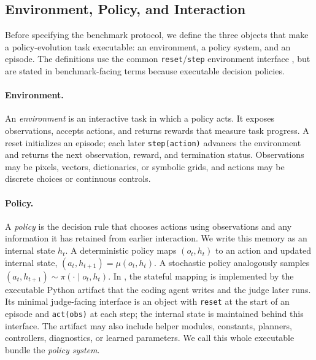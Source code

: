 \subsection{Environment, Policy, and Interaction}
\label{sec:task-objects}

Before specifying the benchmark protocol, we define the three objects that make
a policy-evolution task executable: an environment, a policy system, and an
episode. The definitions use the common \texttt{reset}/\texttt{step}
environment interface \citep{gymnasium}, but are stated in benchmark-facing
terms because 
executable decision policies.

\paragraph{Environment.}
An \emph{environment} is an interactive task in which a policy acts. It exposes
observations, accepts actions, and returns rewards that measure task progress.
A reset initializes an episode; each later \texttt{step(action)} advances the
environment and returns the next observation, reward, and termination status.
Observations may be pixels, vectors, dictionaries, or symbolic grids, and
actions may be discrete choices or continuous controls.

\paragraph{Policy.}
A \emph{policy} is the decision rule that chooses actions using observations
and any information it has retained from earlier interaction. We write this
memory as an internal state $h_t$. A deterministic policy maps
$(o_t,h_t)$ to an action and updated internal state,
$(a_t,h_{t+1})=\mu(o_t,h_t)$. A stochastic policy analogously samples
$(a_t,h_{t+1}) \sim \pi(\cdot \mid o_t,h_t)$. In \evopolicygym{}, the
stateful mapping is implemented by the executable Python artifact that the coding agent writes and the judge later runs. Its minimal judge-facing interface is an object with \texttt{reset} at the start of an episode and \texttt{act(obs)} at each step; the internal state is maintained behind this interface. The artifact may also include helper modules, constants, planners, controllers, diagnostics, or learned parameters. We call this whole executable bundle the \emph{policy system}.

